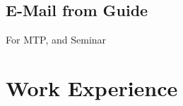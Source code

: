 \documentclass{article}
\begin{document}
	\subsection{E-Mail from Guide}
		For MTP, and Seminar
		\begin{figure}[h]
		\end{figure}
\newpage
\section{Work Experience}
\end{document}
